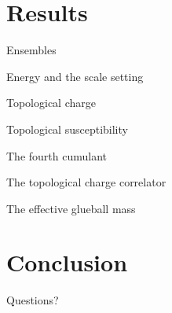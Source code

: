 \documentclass[10pt,show notes on second screen]{beamer}
\begin{document}
\section{Results}

\begin{frame}{Ensembles}
\end{frame}

\begin{frame}{Energy and the scale setting}
\end{frame}

\begin{frame}{Topological charge}
\end{frame}

\begin{frame}{Topological susceptibility}
\end{frame}

\begin{frame}{The fourth cumulant}
\end{frame}

\begin{frame}{The topological charge correlator}
\end{frame}

\begin{frame}{The effective glueball mass}
\end{frame}

\section{Conclusion}
\begin{frame}
\end{frame}

\begin{frame}
Questions?
\end{frame}




\end{document}
